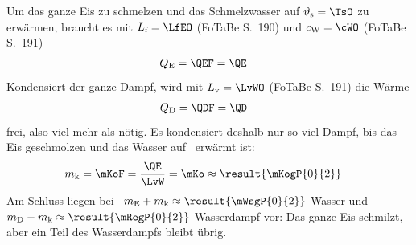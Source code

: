 Um das ganze Eis zu schmelzen und das Schmelzwasser auf $\vartheta_\text{s} = \TsO$ zu erwärmen, braucht es mit $L_\text{f} = \LfEO$ (FoTaBe S.~190) und $c_\text{W} = \cWO$ (FoTaBe S.~191)
\begin{align}
 Q_\text{E} &= \QEF = \QE
\end{align}
Kondensiert der ganze Dampf, wird mit $L_\text{v} = \LvWO$ (FoTaBe S.~191) die Wärme
\begin{align}
 Q_\text{D} &= \QDF = \QD
\end{align}
frei, also viel mehr als nötig. Es kondensiert deshalb nur so viel Dampf, bis das Eis geschmolzen und das Wasser auf \TsO\ erwärmt ist:
\begin{align}
 m_\text{k} &= \mKoF = \frac{\QE}{\LvW} = \mKo \approx \result{\mKogP{0}{2}}
\end{align}
Am Schluss liegen bei \TsO\ $m_\text{E}+m_\text{k} \approx \result{\mWsgP{0}{2}}$ Wasser und $m_\text{D}-m_\text{k} \approx \result{\mRegP{0}{2}}$ Wasserdampf vor: Das ganze Eis schmilzt, aber ein Teil des Wasserdampfs bleibt übrig.

